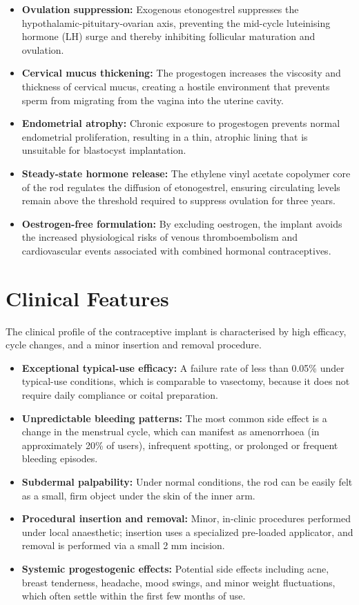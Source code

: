 \begin{itemize}
    \item \textbf{Ovulation suppression:} Exogenous etonogestrel suppresses the hypothalamic-pituitary-ovarian axis, preventing the mid-cycle luteinising hormone (LH) surge and thereby inhibiting follicular maturation and ovulation.
    \item \textbf{Cervical mucus thickening:} The progestogen increases the viscosity and thickness of cervical mucus, creating a hostile environment that prevents sperm from migrating from the vagina into the uterine cavity.
    \item \textbf{Endometrial atrophy:} Chronic exposure to progestogen prevents normal endometrial proliferation, resulting in a thin, atrophic lining that is unsuitable for blastocyst implantation.
    \item \textbf{Steady-state hormone release:} The ethylene vinyl acetate copolymer core of the rod regulates the diffusion of etonogestrel, ensuring circulating levels remain above the threshold required to suppress ovulation for three years.
    \item \textbf{Oestrogen-free formulation:} By excluding oestrogen, the implant avoids the increased physiological risks of venous thromboembolism and cardiovascular events associated with combined hormonal contraceptives.
\end{itemize}

\section*{Clinical Features}
The clinical profile of the contraceptive implant is characterised by high efficacy, cycle changes, and a minor insertion and removal procedure.

\begin{itemize}
    \item \textbf{Exceptional typical-use efficacy:} A failure rate of less than 0.05\% under typical-use conditions, which is comparable to vasectomy, because it does not require daily compliance or coital preparation.
    \item \textbf{Unpredictable bleeding patterns:} The most common side effect is a change in the menstrual cycle, which can manifest as amenorrhoea (in approximately 20\% of users), infrequent spotting, or prolonged or frequent bleeding episodes.
    \item \textbf{Subdermal palpability:} Under normal conditions, the rod can be easily felt as a small, firm object under the skin of the inner arm.
    \item \textbf{Procedural insertion and removal:} Minor, in-clinic procedures performed under local anaesthetic; insertion uses a specialized pre-loaded applicator, and removal is performed via a small 2 mm incision.
    \item \textbf{Systemic progestogenic effects:} Potential side effects including acne, breast tenderness, headache, mood swings, and minor weight fluctuations, which often settle within the first few months of use.
\end{itemize}

